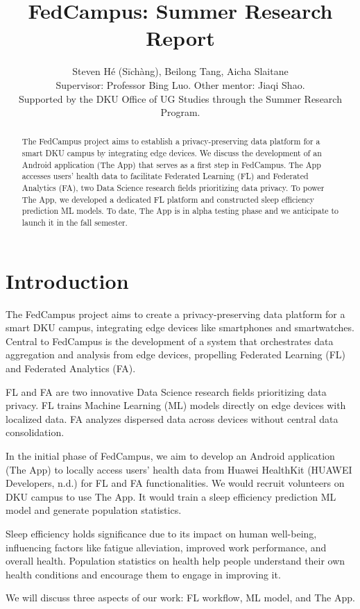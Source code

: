 \documentclass{article}
\title{FedCampus: Summer Research Report}
\author{
    Steven Hé (Sīchàng), Beilong Tang, Aicha Slaitane\\
    Supervisor: Professor Bing Luo. Other mentor: Jiaqi Shao.\\
    Supported by the DKU Office of UG Studies through the Summer Research
    Program.
}
\begin{document}
\maketitle

\begin{abstract}
The FedCampus project aims to establish a privacy-preserving data
platform for a smart DKU campus by integrating edge devices. We discuss
the development of an Android application (The App) that serves as a
first step in FedCampus. The App accesses users' health
data to facilitate Federated Learning (FL) and Federated Analytics (FA),
two Data Science research fields prioritizing data privacy. To power The
App, we developed a dedicated FL platform and constructed sleep
efficiency prediction ML models. To date, The App is in alpha testing
phase and we anticipate to launch it in the fall semester.
\end{abstract}

\section{Introduction}

The FedCampus project aims to create a privacy-preserving data platform
for a smart DKU campus, integrating edge devices like smartphones and
smartwatches. Central to FedCampus is the development of a system that
orchestrates data aggregation and analysis from edge devices, propelling
Federated Learning (FL) and Federated Analytics (FA).

FL and FA are two innovative Data Science research fields prioritizing
data privacy. FL trains Machine Learning (ML) models directly on edge
devices with localized data. FA analyzes dispersed data across devices
without central data consolidation.

In the initial phase of FedCampus, we aim to develop an Android
application (The App) to locally access users' health
data from Huawei HealthKit (HUAWEI Developers, n.d.) for FL and FA
functionalities. We would recruit volunteers on DKU campus to use The
App. It would train a sleep efficiency prediction ML model and generate
population statistics.

Sleep efficiency holds significance due to its impact on human
well-being, influencing factors like fatigue alleviation, improved work
performance, and overall health. Population statistics on health help
people understand their own health conditions and encourage them to
engage in improving it.

We will discuss three aspects of our work: FL workflow, ML model, and
The App.
\end{document}
